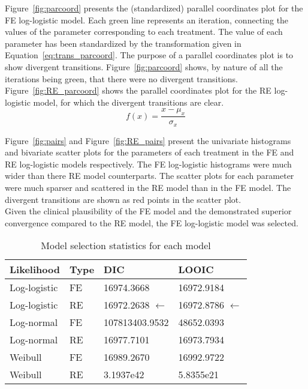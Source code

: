 Figure~\ref{fig:parcoord} presents the (standardized) parallel coordinates plot for the FE log-logistic model. Each green line represents an iteration, connecting the values of the parameter corresponding to each treatment. The value of each parameter has been standardized by the transformation given in Equation~\ref{eq:trans_parcoord}. The purpose of a parallel coordinates plot is to show divergent transitions. Figure~\ref{fig:parcoord} shows, by nature of all the iterations being green, that there were no divergent transitions. Figure~\ref{fig:RE_parcoord} shows the parallel coordinates plot for the RE log-logistic model, for which the divergent transitions are clear.\\

\begin{equation}
    f(x) = \frac{x - \mu_x}{\sigma_x}
    \label{eq:trans_parcoord}
\end{equation}

Figure~\ref{fig:pairs} and Figure~\ref{fig:RE_pairs} present the univariate histograms and bivariate scatter plots for the parameters of each treatment in the FE and RE log-logistic models respectively. The FE log-logistic histograms were much wider than there RE model counterparts. The scatter plots for each parameter were much sparser and scattered in the RE model than in the FE model. The divergent transitions are shown as red points in the scatter plot. \\

Given the clinical plausibility of the FE model and the demonstrated superior convergence compared to the RE model, the FE log-logistic model was selected.

\begin{table}[h]
    \centering
    \begin{tabular}{llll}
    \hline
    Likelihood   & Type & DIC         & LOOIC      \\ \hline
    Log-logistic & FE  & 16974.3668  & 16972.9184 \\
    Log-logistic & RE & 16972.2638  $\leftarrow$ & 16972.8786 $\leftarrow$ \\
    Log-normal   & FE  & 107813403.9532  & 48652.0393 \\
    Log-normal   & RE & 16977.7101  & 16973.7934 \\
    Weibull      & FE  & 16989.2670 & 16992.9722 \\
    Weibull      & RE & 3.1937e42 & 5.8355e21 \\ \hline
    \end{tabular}
    \caption{Model selection statistics for each model}
    \label{tab:selectionstatbc}
\end{table}

